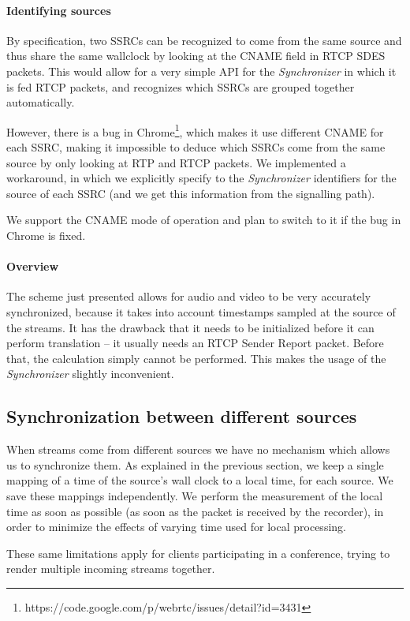 \documentclass[twoside,openright,a4paper,12pt,english]{article}
\begin{document}
\paragraph{Identifying sources}
By specification, two SSRCs can be recognized to come from the same source and thus share the same
wallclock by looking at the CNAME field in RTCP SDES packets. This would allow for a very simple API for 
the \emph{Synchronizer} in which it is fed RTCP packets, and recognizes which
SSRCs are grouped together automatically. 

However, there is a bug in
Chrome\footnote{https://code.google.com/p/webrtc/issues/detail?id=3431}, which
makes it use different CNAME for each SSRC, making it impossible to deduce
which SSRCs come from the same source by only looking at RTP and RTCP packets.
We implemented a workaround, in which we explicitly specify to the
\emph{Synchronizer} identifiers for the source of each SSRC (and we get this
information from the signalling path).

We support the CNAME mode of operation and plan to switch to it if the bug in Chrome is fixed.

\paragraph{Overview}
The scheme just presented allows for audio and video to be very accurately synchronized, because 
it takes into account timestamps sampled at the source of the streams. It has
the drawback that it needs to be initialized before it can
perform translation -- it usually needs an RTCP Sender Report packet. Before
that, the calculation simply cannot be performed. This makes the usage of the
\emph{Synchronizer} slightly inconvenient.


\subsection{Synchronization between different sources}
When streams come from different sources we have no mechanism which allows us
to synchronize them. As explained in the previous section, we keep a single
mapping of a time of the source's wall clock to a local time, for each source.
We save these mappings independently. We perform the measurement of the local
time as soon as possible (as soon as the packet is received by the recorder),
in order to minimize the effects of varying time used for local processing.

These same limitations apply for clients participating in a conference, trying to
render multiple incoming streams together.
\end{document}

